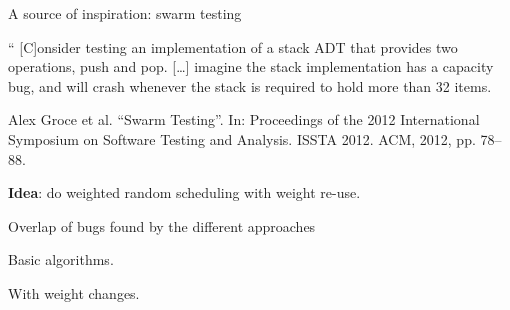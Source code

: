 \documentclass{beamer}
\begin{document}
\begin{frame}{A source of inspiration: swarm testing}
  \begin{displayquote}
    \hspace{-0.7cm} {\Huge ``}
    [C]onsider testing an implementation of a stack ADT that provides
    two operations, push and pop. [\ldots] imagine the stack
    implementation has a capacity bug, and will crash whenever the
    stack is required to hold more than 32 items.

    \vspace{1em}

    \noindent\normalfont\footnotesize
    Alex Groce et al. ``Swarm Testing''. In: Proceedings of the 2012
    International Symposium on Software Testing and Analysis. ISSTA
    2012. ACM, 2012, pp. 78–88.
  \end{displayquote}

  \textbf{Idea}: do weighted random scheduling with weight re-use.
\end{frame}

\begin{frame}{Overlap of bugs found by the different approaches}
\begin{center}
\begin{minipage}{0.3\textwidth}
  \centering

  \small Basic algorithms.
\end{minipage}
\hspace{2cm}
\begin{minipage}{0.3\textwidth}
  \centering

  \small With weight changes.
\end{minipage}
\end{center}
\end{frame}
\end{document}
